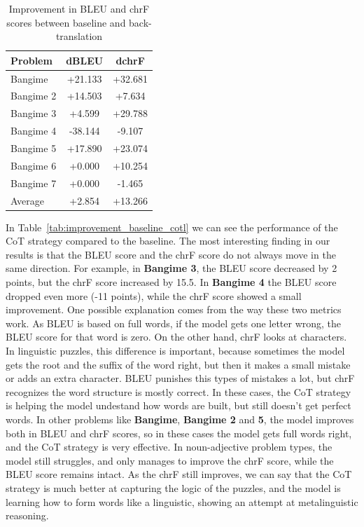 \documentclass[
	a4paper, %
	10pt, %
	unnumberedsections, %
	twoside, %
]{LTJournalArticle}
\begin{document}
\begin{table}[h]
\centering
\caption{Improvement in BLEU and chrF scores between baseline and back-translation}
\label{tab:improvement_baseline_backtr}
\begin{tabular}{l c c}
\hline
\textbf{Problem} & \textbf{dBLEU} & \textbf{dchrF} \\
\hline
Bangime    & +21.133 & +32.681 \\
Bangime 2    & +14.503 & +7.634 \\
Bangime 3    & +4.599 & +29.788 \\
Bangime 4    & -38.144 & -9.107 \\
Bangime 5    & +17.890 & +23.074 \\
Bangime 6    & +0.000 &  +10.254 \\
Bangime 7    & +0.000 & -1.465 \\
\hline
Average		& +2.854 & +13.266 \\
\hline
\end{tabular}
\end{table}

In Table~\ref{tab:improvement_baseline_cotl} we can see the performance of the CoT strategy compared to the baseline. The most interesting finding in our results is that the BLEU score and the chrF score do not always move in the same direction. For example, in \textbf{Bangime 3}, the BLEU score decreased by 2 points, but the chrF score increased by 15.5. In \textbf{Bangime 4} the BLEU score dropped even more (-11 points), while the chrF score showed a small improvement.
One possible explanation comes from the way these two metrics work. As BLEU is based on full words, if the model gets one letter wrong, the BLEU score for that word is zero. On the other hand, chrF looks at characters. In linguistic puzzles, this difference is important, because sometimes the model gets the root and the suffix of the word right, but then it makes a small mistake or adds an extra character. BLEU punishes this types of mistakes a lot, but chrF recognizes the word structure is mostly correct. In these cases, the CoT strategy is helping the model undestand how words are built, but still doesn't get perfect words.
In other problems like \textbf{Bangime}, \textbf{Bangime 2} and \textbf{5}, the model improves both in BLEU and chrF scores, so in these cases the model gets full words right, and the CoT strategy is very effective. In noun-adjective problem types, the model still struggles, and only manages to improve the chrF score, while the BLEU score remains intact. As the chrF still improves, we can say that the CoT strategy is much better at capturing the logic of the puzzles, and the model is learning how to form words like a linguistic, showing an attempt at metalinguistic reasoning.
\end{document}
